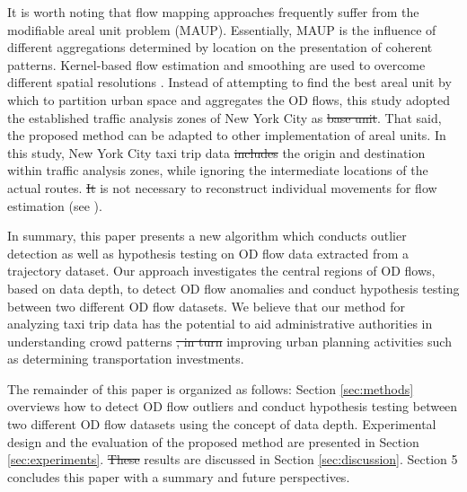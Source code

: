 \documentclass[a4paper,UKenglish]{lipics-v2018}
\providecommand{\DIFadd}[1]{{\protect\color{blue}\uwave{#1}}} %
\providecommand{\DIFdel}[1]{{\protect\color{red}\sout{#1}}}                      %
\providecommand{\DIFaddbegin}{} %
\providecommand{\DIFaddend}{} %
\providecommand{\DIFdelbegin}{} %
\providecommand{\DIFdelend}{} %
\begin{document}
It is worth noting that flow mapping approaches frequently suffer from the modifiable areal unit problem (MAUP). 
Essentially, MAUP is the influence of different aggregations determined by location on the presentation of coherent patterns.
Kernel-based flow estimation and smoothing are used to overcome different spatial resolutions \cite{guo14IEEETVCG}. 
Instead of attempting to find the best areal unit by which to partition urban space and aggregates the OD flows, this study adopted the established traffic analysis zones of New York City as \DIFdelbegin \DIFdel{base unit}\DIFdelend \DIFaddbegin \DIFadd{the base units}\DIFaddend .
That said, the proposed method can be adapted to other implementation of areal units.
In this study, New York City taxi trip data \DIFdelbegin \DIFdel{includes }\DIFdelend \DIFaddbegin \DIFadd{include }\DIFaddend the origin and destination within traffic analysis zones, while ignoring the intermediate locations of the actual routes.
\DIFdelbegin \DIFdel{It }\DIFdelend \DIFaddbegin \DIFadd{Note that it }\DIFaddend is not necessary to reconstruct individual movements for flow estimation (see \cite{duckham16ICGIS}).

In summary, this paper presents a new algorithm which conducts outlier detection as well as hypothesis testing on OD flow data extracted from a trajectory dataset.
Our approach investigates the central regions of OD flows, based on data depth, to detect OD flow anomalies and conduct hypothesis testing between two different OD flow datasets.
We believe that our method for analyzing taxi trip data has the potential to aid administrative authorities in understanding crowd patterns \DIFdelbegin \DIFdel{, in turn }\DIFdelend \DIFaddbegin \DIFadd{and }\DIFaddend improving urban planning activities such as determining transportation investments. 

The remainder of this paper is organized as follows: Section \ref{sec:methods} overviews how to detect OD flow outliers and conduct hypothesis testing between two different OD flow datasets using the concept of data depth. 
Experimental design and the evaluation of the proposed method are presented in Section \ref{sec:experiments}. 
\DIFdelbegin \DIFdel{These }\DIFdelend \DIFaddbegin \DIFadd{The }\DIFaddend results are discussed in Section \ref{sec:discussion}. 
Section 5 concludes this paper with a summary and future perspectives.
\end{document}
